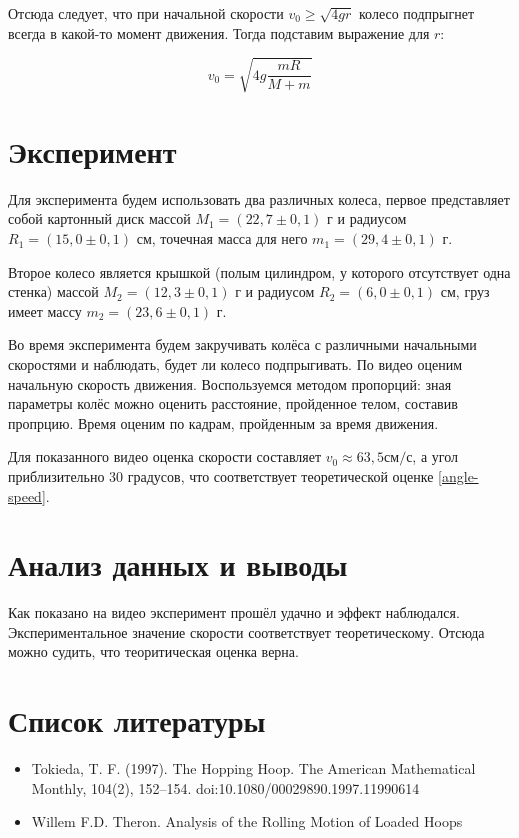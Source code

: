 \documentclass[a4paper,12pt]{article}
\begin{document}
Отсюда следует, что при начальной скорости $v_0 \ge \sqrt{4gr}$ колесо подпрыгнет всегда в какой-то момент движения. Тогда подставим выражение для $r$:

\begin{equation}
    v_0 = \sqrt{4g \frac{mR}{M + m}}
\end{equation}

\section{Эксперимент}

Для эксперимента будем использовать два различных колеса, первое представляет собой картонный диск массой $M_1 = (22,7 \pm 0,1)$ г и радиусом $R_1 = (15,0 \pm 0,1)$ см, точечная масса для него $m_1 = (29,4 \pm 0,1)$ г. 

Второе колесо является крышкой (полым цилиндром, у которого отсутствует одна стенка) массой $M_2 = (12,3 \pm 0,1)$ г и радиусом $R_2 = (6,0 \pm 0,1)$ см, груз имеет массу $m_2 = (23,6 \pm 0,1)$ г.

Во время эксперимента будем закручивать колёса с различными начальными скоростями и наблюдать, будет ли колесо подпрыгивать. По видео оценим начальную скорость движения. Воспользуемся методом пропорций: зная параметры колёс можно оценить расстояние, пройденное телом, составив пропрцию. Время оценим по кадрам, пройденным за время движения.

Для показанного видео оценка скорости составляет $v_0 \approx 63,5 \text{см}/\text{с}$, а угол приблизительно 30 градусов, что соответствует теоретической оценке \ref{angle-speed}.

\section{Анализ данных и выводы}

Как показано на видео эксперимент прошёл удачно и эффект наблюдался. Экспериментальное значение скорости соответствует теоретическому. Отсюда можно судить, что теоритическая оценка верна.

\section{Список литературы}

\begin{itemize}
    \item Tokieda, T. F. (1997). The Hopping Hoop. The American Mathematical Monthly, 104(2), 152–154. doi:10.1080/00029890.1997.11990614 
    \item Willem F.D. Theron. Analysis of the Rolling Motion of Loaded Hoops
\end{itemize}
\end{document}
